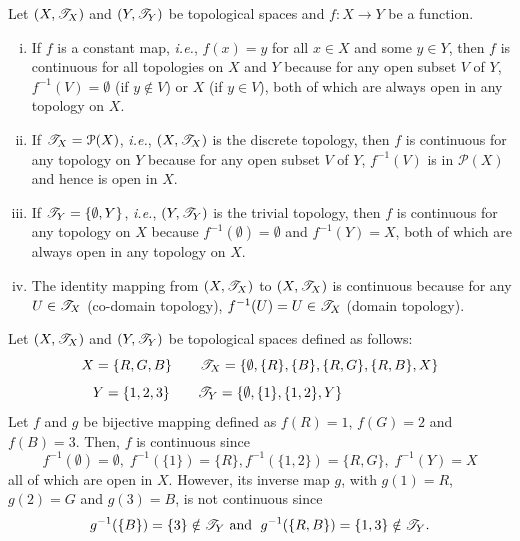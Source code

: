 \documentclass[a4paper,english,12pt]{article}
\begin{document}
\begin{exmp}
Let $(X,\mathscr{T}_X)$ and $(Y,\mathscr{T}_Y)$ be topological spaces and $f:X\to Y$ be a function.
\begin{enumerate}[i)]
\item If $f$ is a constant map, \emph{i.e.}, $f(x)=y$ for all $x\in X$ and some $y\in Y$, then $f$ is continuous for all topologies on $X$ and $Y$ because for any open subset $V$ of $Y$, $f^{-1}(V)=\emptyset$ (if $y\notin V$) or $X$ (if $y\in V$), both of which are always open in any topology on $X$.
\item If $\mathscr{T}_X=\mathcal{P}(X)$, \emph{i.e.}, $(X,\mathscr{T}_X)$ is the discrete topology, then $f$ is continuous for any topology on $Y$ because for any open subset $V$ of $Y$, $f^{-1}(V)$ is in $\mathcal{P}(X)$ and hence is open in $X$.
\item If $\mathscr{T}_Y=\{\emptyset,Y\}$, \emph{i.e.}, $(Y,\mathscr{T}_Y)$ is the trivial topology, then $f$ is continuous for any topology on $X$ because $f^{-1}(\emptyset)=\emptyset$ and $f^{-1}(Y)=X$, both of which are always open in any topology on $X$.
\item The identity mapping from $(X,\mathscr{T}_X)$ to $(X,\mathscr{T}_X)$ is continuous because for any $U\in \mathscr{T}_X$ (co-domain topology), $f^{-1}(U)=U\in \mathscr{T}_X$ (domain topology).
\end{enumerate}
\label{many_ex}
\end{exmp}

\begin{exmp}
\item Let $(X,\mathscr{T}_X)$ and $(Y,\mathscr{T}_Y)$ be topological spaces defined as follows: 
\begin{equation*}
X=\{R,G,B\} \qquad \mathscr{T}_X=\{\emptyset,\{R\},\{B\},\{R,G\},\{R,B\},X\}
\end{equation*}
\begin{equation*}
Y=\{1,2,3\} \qquad  \mathscr{T}_Y=\{\emptyset,\{1\},\{1,2\},Y\} \qquad \qquad \qquad
\end{equation*}
Let $f$ and $g$ be bijective mapping defined as $f(R)=1$, $f(G)=2$ and $f(B)=3$. Then, $f$ is continuous since 
\begin{equation*}
f^{-1}(\emptyset)=\emptyset, \; f^{-1}(\{1\})=\{R\}, f^{-1}(\{1,2\})=\{R,G\}, \; f^{-1}(Y)=X 
\end{equation*}
all of which are open in $X$. However, its inverse map $g$, with $g(1)=R$, $g(2)=G$ and $g(3)=B$, is not continuous since 
\begin{equation*}
g^{-1}(\{B\})=\{3\}\notin \mathscr{T}_Y \text{ and } \; g^{-1}(\{R,B\})=\{1,3\}\notin \mathscr{T}_Y.
\end{equation*}
\label{inv_discont}
\end{exmp}
\end{document}
